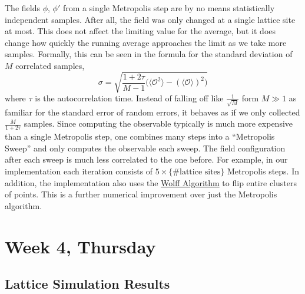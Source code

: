 \documentclass[12pt]{article}
\begin{document}
The fields $\phi$, $\phi'$ from a single Metropolis step are by no
means statistically independent samples. After all, the field was only
changed at a single lattice site at most. This does not affect the
limiting value for the average, but it does change how quickly the
running average approaches the limit as we take more
samples. Formally, this can be seen in the formula for the standard
deviation of $M$ correlated samples,
\begin{equation}
  \sigma = 
  \sqrt{
    \frac{1+2\tau}{M-1}
    \Big( \langle\mathcal{O}^2\rangle 
    - (\langle\mathcal{O}\rangle)^2 \Big)
  }
\end{equation}
where $\tau$ is the autocorrelation time. Instead of falling off like
$\frac{1}{\sqrt{M}}$ form $M\gg1$ as familiar for the standard error
of random errors, it behaves as if we only collected
$\frac{M}{1+2\tau}$ samples. Since computing the observable typically
is much more expensive than a single Metropolis step, one combines
many steps into a ``Metropolis Sweep'' and only computes the
observable each sweep. The field configuration after each sweep is
much less correlated to the one before. For example, in our
implementation each iteration consists of $5 \times \{\text{\# lattice
  sites}\}$ Metropolis steps. In addition, the implementation also
uses the \href{http://en.wikipedia.org/wiki/Wolff_algorithm}{Wolff
  Algorithm} to flip entire clusters of points. This is a further
numerical improvement over just the Metropolis algorithm. 



\section{Week 4, Thursday}

\subsection{Lattice Simulation Results}
\end{document}

